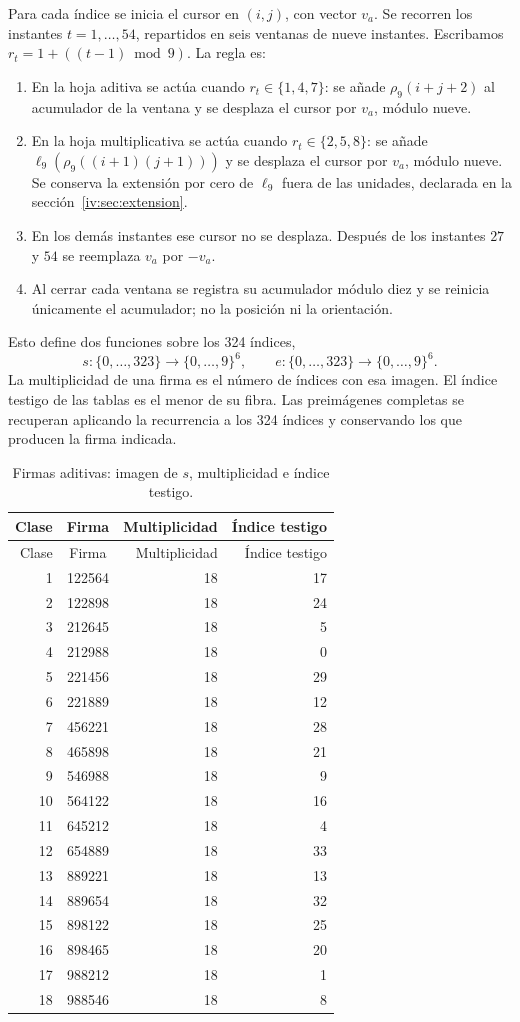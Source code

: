 Para cada índice se inicia el cursor en \((i,j)\), con vector \(v_a\).
Se recorren los instantes \(t=1,\ldots,54\), repartidos en seis ventanas
de nueve instantes. Escribamos \(r_t=1+((t-1)\bmod9)\). La regla es:
\begin{enumerate}
\item En la hoja aditiva se actúa cuando \(r_t\in\{1,4,7\}\):
se añade \(\rho_9(i+j+2)\) al acumulador de la ventana y se
desplaza el cursor por \(v_a\), módulo nueve.
\item En la hoja multiplicativa se actúa cuando \(r_t\in\{2,5,8\}\):
se añade \(\ell_9(\rho_9((i+1)(j+1)))\) y se desplaza el cursor
por \(v_a\), módulo nueve. Se conserva la extensión por cero de
\(\ell_9\) fuera de las unidades, declarada en la sección~\ref{iv:sec:extension}.
\item En los demás instantes ese cursor no se desplaza. Después
de los instantes \(27\) y \(54\) se reemplaza \(v_a\) por \(-v_a\).
\item Al cerrar cada ventana se registra su acumulador módulo diez
y se reinicia únicamente el acumulador; no la posición ni la orientación.
\end{enumerate}
Esto define dos funciones sobre los 324 índices,
\[
 s:\{0,\ldots,323\}\longrightarrow\{0,\ldots,9\}^6,\qquad
 e:\{0,\ldots,323\}\longrightarrow\{0,\ldots,9\}^6.
\]
La multiplicidad de una firma es el número de índices con esa imagen.
El índice testigo de las tablas es el menor de su fibra.
Las preimágenes completas se recuperan aplicando la recurrencia a los
324 índices y conservando los que producen la firma indicada.

\begin{longtable}{rcrr}
\caption{Firmas aditivas: imagen de \(s\), multiplicidad e índice testigo.}
\label{iv:iv:tabla-firmas-aditivas}\\
\toprule
Clase & Firma & Multiplicidad & Índice testigo\\
\midrule
\endfirsthead
\toprule
Clase & Firma & Multiplicidad & Índice testigo\\
\midrule
\endhead
1&122564&18&17\\
2&122898&18&24\\
3&212645&18&5\\
4&212988&18&0\\
5&221456&18&29\\
6&221889&18&12\\
7&456221&18&28\\
8&465898&18&21\\
9&546988&18&9\\
10&564122&18&16\\
11&645212&18&4\\
12&654889&18&33\\
13&889221&18&13\\
14&889654&18&32\\
15&898122&18&25\\
16&898465&18&20\\
17&988212&18&1\\
18&988546&18&8\\
\bottomrule
\end{longtable}

